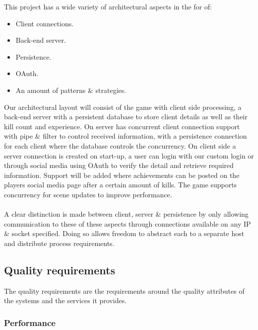 \documentclass[letterpaper]{article}
\begin{document}
			This project has a wide variety of architectural aspects in the for of:
			\begin{itemize}
				\item Client connections.
				\item Back-end server.
				\item Persistence.
				\item OAuth.
				\item An amount of patterns \& strategies.
			\end{itemize}
			Our architectural layout will consist of the game with client side processing, a back-end server with a persistent database to store client details as well as their kill count and experience. On server has concurrent client connection support with pipe \& filter to control received information, with a persistence connection for each client where the database controls the concurrency. On client side a server connection is created on start-up, a user can login with our custom login or through social media using OAuth to verify the detail and retrieve required information. Support will be added where achievements can be posted on the players social media page after a certain amount of kills. The game supports concurrency for scene updates to improve performance. \\ \\
			
			A clear distinction is made between client, server \& persistence by only allowing communication to these of these aspects through connections available on any IP \& socket specified. Doing so allows freedom to abstract each to a separate host and distribute process requirements.
				
			\vspace{0.2in}
			\subsection*{ Quality requirements }
			\vspace{0.1in}
				
				The quality requirements are the requirements around the quality attributes of the systems and the
				services it provides.
				
				\subsubsection*{Performance}
				\vspace{0.1in}
				
\end{document}
